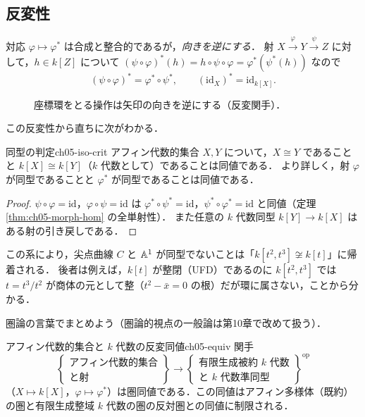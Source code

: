 \subsection{反変性}

対応 $\varphi\mapsto\varphi^*$ は合成と整合的であるが，\emph{向きを逆にする}．
射 $X\xrightarrow{\varphi}Y\xrightarrow{\psi}Z$ に対して，$h\in k[Z]$ について
$(\psi\circ\varphi)^*(h)=h\circ\psi\circ\varphi=\varphi^*(\psi^*(h))$ なので
\[
  (\psi\circ\varphi)^*=\varphi^*\circ\psi^*,\qquad (\mathrm{id}_X)^*=\mathrm{id}_{k[X]}.
\]

\begin{figure}[H]
\centering
{}
\caption{座標環をとる操作は矢印の向きを逆にする（反変関手）．}
\end{figure}

この反変性から直ちに次がわかる．

\begin{mycor}{同型の判定}{ch05-iso-crit}
アフィン代数的集合 $X,Y$ について，$X\cong Y$ であることと $k[X]\cong k[Y]$（$k$ 代数として）であることは同値である．
より詳しく，射 $\varphi$ が同型であることと $\varphi^*$ が同型であることは同値である．
\end{mycor}

\begin{proof}
$\psi\circ\varphi=\mathrm{id}$，$\varphi\circ\psi=\mathrm{id}$ は $\varphi^*\circ\psi^*=\mathrm{id}$，$\psi^*\circ\varphi^*=\mathrm{id}$ と同値（定理 \ref{thm:ch05-morph-hom} の全単射性）．
また任意の $k$ 代数同型 $k[Y]\to k[X]$ はある射の引き戻しである．
\end{proof}

この系により，尖点曲線 $C$ と $\mathbb{A}^1$ が同型でないことは「$k[t^2,t^3]\not\cong k[t]$」に帰着される．
後者は例えば，$k[t]$ が整閉（UFD）であるのに $k[t^2,t^3]$ では $t=t^3/t^2$ が商体の元として整（$t^2-\bar x=0$ の根）だが環に属さない，ことから分かる．

圏論の言葉でまとめよう（圏論的視点の一般論は第10章で改めて扱う）．

\begin{mythm}{アフィン代数的集合と $k$ 代数の反変同値}{ch05-equiv}
関手
\[
  \left\{\begin{array}{c}\text{アフィン代数的集合}\\ \text{と射}\end{array}\right\}
  \longrightarrow
  \left\{\begin{array}{c}\text{有限生成被約 } k \text{ 代数}\\ \text{と } k \text{ 代数準同型}\end{array}\right\}^{\mathrm{op}}
\]
（$X\mapsto k[X]$，$\varphi\mapsto\varphi^*$）は圏同値である．この同値はアフィン多様体（既約）の圏と有限生成整域 $k$ 代数の圏の反対圏との同値に制限される．
\end{mythm}

